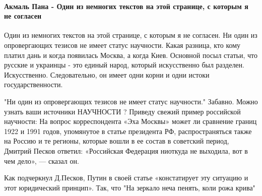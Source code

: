  
 
 
 
 
\paragraph{Акмаль Пана - Один из немногих текстов на этой странице, с которым я не согласен}

\begin{itemize}
 

Один из немногих текстов на этой странице, с которым я не согласен. Ни один из
опровергающих тезисов не имеет статус научности. Какая разница, кто кому платил
дань и когда появилась Москва, а когда Киев. Основной посыл статьи, что русские
и украинцы - это единый народ, который искусственно был разделен. Искусственно.
Следовательно, он имеет одни корни и одни истоки государственности.

\begin{itemize}
 

"Ни один из опровергающих тезисов не имеет статус научности." Забавно. Можно
узнать ваши источники НАУЧНОСТИ ? Приведу свежий пример российской научности:
На вопрос корреспондента «Эха Москвы» может ли сравнение границ 1922 и 1991
годов, упомянутое в статье президента РФ, распространяться также на Россию и те
регионы, которые вошли в ее состав в советский период, Дмитрий Песков ответил:
«Российская Федерация ниоткуда не выходила, вот в чем дело», — сказал он.

Как подчеркнул Д.Песков, Путин в своей статье «констатирует эту ситуацию и этот
юридический принцип». Так, что "На зеркало неча пенять, коли рожа крива"


 


\end{itemize}
\end{itemize}
